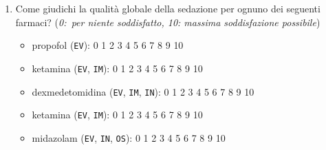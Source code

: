 \begin{tcolorbox}[breakable,notitle,boxrule=0pt,colback=xkcdCloudyBlue!30,colframe=xkcdCloudyBlue!30]
\begin{enumerate}
           \item Come giudichi la qualità globale della sedazione per ognuno dei seguenti farmaci? (\emph{0:~per niente soddisfatto, 10: massima soddisfazione possibile})
           \begin{itemize}
               \item propofol (\texttt{EV}): \colorbox{xkcdCloudyBlue!70}{0} \colorbox{xkcdCloudyBlue!70}{1} \colorbox{xkcdCloudyBlue!70}{2} \colorbox{xkcdCloudyBlue!70}{3} \colorbox{xkcdCloudyBlue!70}{4} \colorbox{xkcdCloudyBlue!70}{5} \colorbox{xkcdCloudyBlue!70}{6} \colorbox{xkcdCloudyBlue!70}{7} \colorbox{xkcdCloudyBlue!70}{8} \colorbox{xkcdCloudyBlue!70}{9} \colorbox{xkcdCloudyBlue!70}{10}
               \item ketamina (\texttt{EV}, \texttt{IM}): \colorbox{xkcdCloudyBlue!70}{0} \colorbox{xkcdCloudyBlue!70}{1} \colorbox{xkcdCloudyBlue!70}{2} \colorbox{xkcdCloudyBlue!70}{3} \colorbox{xkcdCloudyBlue!70}{4} \colorbox{xkcdCloudyBlue!70}{5} \colorbox{xkcdCloudyBlue!70}{6} \colorbox{xkcdCloudyBlue!70}{7} \colorbox{xkcdCloudyBlue!70}{8} \colorbox{xkcdCloudyBlue!70}{9} \colorbox{xkcdCloudyBlue!70}{10}
               \item dexmedetomidina (\texttt{EV}, \texttt{IM}, \texttt{IN}): \colorbox{xkcdCloudyBlue!70}{0} \colorbox{xkcdCloudyBlue!70}{1} \colorbox{xkcdCloudyBlue!70}{2} \colorbox{xkcdCloudyBlue!70}{3} \colorbox{xkcdCloudyBlue!70}{4} \colorbox{xkcdCloudyBlue!70}{5} \colorbox{xkcdCloudyBlue!70}{6} \colorbox{xkcdCloudyBlue!70}{7} \colorbox{xkcdCloudyBlue!70}{8} \colorbox{xkcdCloudyBlue!70}{9} \colorbox{xkcdCloudyBlue!70}{10}
               \item ketamina (\texttt{EV}, \texttt{IM}): \colorbox{xkcdCloudyBlue!70}{0} \colorbox{xkcdCloudyBlue!70}{1} \colorbox{xkcdCloudyBlue!70}{2} \colorbox{xkcdCloudyBlue!70}{3} \colorbox{xkcdCloudyBlue!70}{4} \colorbox{xkcdCloudyBlue!70}{5} \colorbox{xkcdCloudyBlue!70}{6} \colorbox{xkcdCloudyBlue!70}{7} \colorbox{xkcdCloudyBlue!70}{8} \colorbox{xkcdCloudyBlue!70}{9} \colorbox{xkcdCloudyBlue!70}{10}
               \item midazolam (\texttt{EV}, \texttt{IN}, \texttt{OS}): \colorbox{xkcdCloudyBlue!70}{0} \colorbox{xkcdCloudyBlue!70}{1} \colorbox{xkcdCloudyBlue!70}{2} \colorbox{xkcdCloudyBlue!70}{3} \colorbox{xkcdCloudyBlue!70}{4} \colorbox{xkcdCloudyBlue!70}{5} \colorbox{xkcdCloudyBlue!70}{6} \colorbox{xkcdCloudyBlue!70}{7} \colorbox{xkcdCloudyBlue!70}{8} \colorbox{xkcdCloudyBlue!70}{9} \colorbox{xkcdCloudyBlue!70}{10}
           \end{itemize}
           

\end{enumerate}
\end{tcolorbox}
